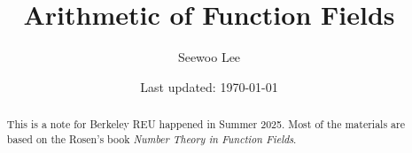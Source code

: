\documentclass[letterpaper, 10pt]{article}
\begin{document}

\title{Arithmetic of Function Fields}


\author{Seewoo Lee}
\date{\normalsize\vspace{-1ex} Last updated: \today}


\maketitle



\begin{abstract}
This is a note for Berkeley REU happened in Summer 2025.
Most of the materials are based on the Rosen's book \textit{Number Theory in Function Fields}.
\end{abstract}

\newpage
\tableofcontents
\newpage








\newpage


\newpage










\end{document}
